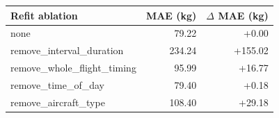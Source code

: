 \begin{tabular}{lrr}
\toprule
Refit ablation & MAE (kg) & $\Delta$ MAE (kg) \\
\midrule
none & 79.22 & +0.00 \\
remove\_interval\_duration & 234.24 & +155.02 \\
remove\_whole\_flight\_timing & 95.99 & +16.77 \\
remove\_time\_of\_day & 79.40 & +0.18 \\
remove\_aircraft\_type & 108.40 & +29.18 \\
\bottomrule
\end{tabular}
